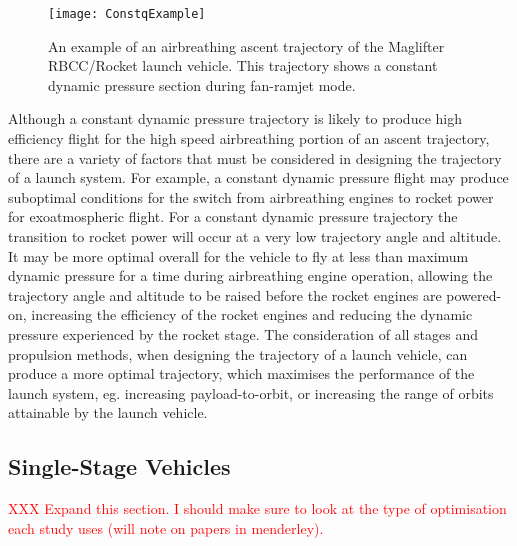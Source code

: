 \begin{figure}[ht]
	\centering
	\texttt{[image: ConstqExample]}
	\caption{An example of an airbreathing ascent trajectory of the Maglifter RBCC/Rocket launch vehicle\cite{Olds1998}. This trajectory shows a constant dynamic pressure section during fan-ramjet mode\cite{Olds1998}.}
	\label{fig:constqexample}
\end{figure}
Although a constant dynamic pressure trajectory is likely to produce high efficiency flight for the high speed airbreathing portion of an ascent trajectory, there are a variety of factors that must be considered in designing the trajectory of a launch system. 
For example, a constant dynamic pressure flight may produce suboptimal conditions for the switch from airbreathing engines to rocket power for exoatmospheric flight. 
 For a constant dynamic pressure trajectory the transition to rocket power will occur at a very low trajectory angle and altitude\cite{Preller2017b}. 
 It may be more optimal overall for the vehicle to fly at less than maximum dynamic pressure for a time during airbreathing engine operation, allowing the trajectory angle and altitude to be raised before the rocket engines are powered-on, increasing the efficiency of the rocket engines and reducing the dynamic pressure experienced by the rocket stage\cite{Tsuchiya2005,Wilhite1991,Mehta2001}.
 The consideration of all stages and propulsion methods, when designing the trajectory of a launch vehicle, can produce a more optimal trajectory, which maximises the performance of the launch system, eg. increasing payload-to-orbit, or increasing the range of orbits attainable by the launch vehicle.

\subsection{Single-Stage Vehicles}
\textcolor{red}{XXX Expand this section. I should make sure to look at the type of optimisation each study uses (will note on papers in menderley).}

